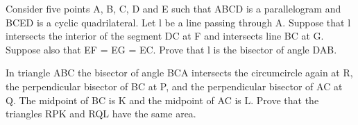 \item Consider five points A, B, C, D and E such that ABCD is a parallelogram and BCED is a cyclic quadrilateral. Let l be a line passing through A. Suppose that l intersects the interior of the segment DC at F and intersects line BC at G. Suppose also that EF = EG = EC. Prove that l is the bisector of angle DAB.

\item In triangle ABC the bisector of angle BCA intersects the circumcircle again at R, the perpendicular bisector of BC at P, and the perpendicular bisector of AC at Q. The midpoint of BC is K and the midpoint of AC is L. Prove that the triangles RPK and RQL have the same area.
